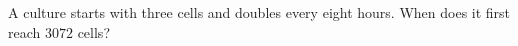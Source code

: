 A culture starts with three cells and doubles every eight hours. When does it first reach $3072$ cells?
